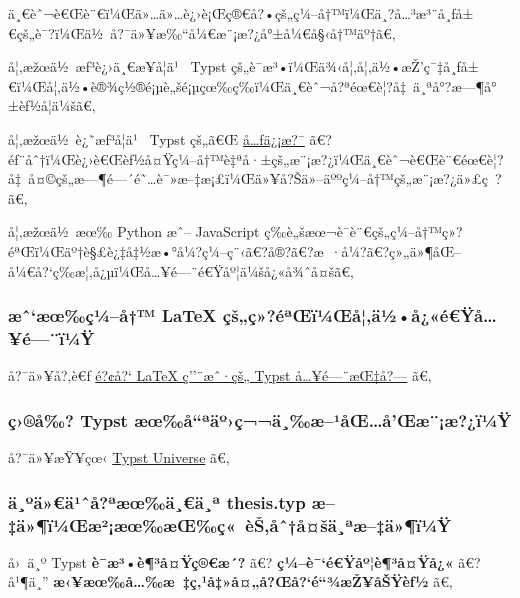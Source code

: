 ä¸€èˆ¬è€Œè¨€ï¼Œä»\ldots ä»\ldots è¿›è¡Œç®€å?•çš„ç¼--å†™ï¼Œä¸?å\ldots³æ³¨å¸ƒå±€çš„è¯?ï¼Œä½~å?¯ä»¥æ‰``å¼€æ¨¡æ?¿å°±å¼€å§‹å†™äº†ã€‚

å¦‚æžœä½~æƒ³è¿›ä¸€æ­¥å­¦ä¹~ Typst
çš„è¯­æ³•ï¼Œä¾‹å¦‚å¦‚ä½•æŽ'ç¯‡å¸ƒå±€ï¼Œå¦‚ä½•è®¾ç½®é¡µè„šé¡µçœ‰ç­‰ï¼Œä¸€èˆ¬å?ªéœ€è¦?å‡~ä¸ªå°?æ---¶å°±èƒ½å­¦ä¼šã€‚

å¦‚æžœä½~è¿˜æƒ³å­¦ä¹~ Typst çš„ã€Œ
\href{https://typst-doc-cn.github.io/docs/reference/meta/}{å\ldots ƒä¿¡æ?¯}
ã€?éƒ¨åˆ†ï¼Œè¿›è€Œèƒ½å¤Ÿç¼--å†™è‡ªå·±çš„æ¨¡æ?¿ï¼Œä¸€èˆ¬è€Œè¨€éœ€è¦?å‡~å¤©çš„æ---¶é---´é˜\ldots è¯»æ--‡æ¡£ï¼Œä»¥å?Šä»--äººç¼--å†™çš„æ¨¡æ?¿ä»£ç~?ã€‚

å¦‚æžœä½~æœ‰ Python æˆ-- JavaScript
ç­‰è„šæœ¬è¯­è¨€çš„ç¼--å†™ç»?éªŒï¼Œäº†è§£è¿‡å‡½æ•°å¼?ç¼--ç¨‹ã€?å®?ã€?æ~·å¼?ã€?ç»„ä»¶åŒ--å¼€å?{}`ç­‰æ¦‚å¿µï¼Œå\ldots¥é---¨é€Ÿåº¦ä¼šå¿«å¾ˆå¤šã€‚

\subsubsection{æˆ`æœ‰ç¼--å†™ LaTeX
çš„ç»?éªŒï¼Œå¦‚ä½•å¿«é€Ÿå\ldots¥é---¨ï¼Ÿ}\label{uxe6ux2c6uxe6ux153uxe7uxbcuxe5-latex-uxe7ux161uxe7uxe9uxaaux153uxefuxbcux153uxe5uxe4uxbduxe5uxe9uxffuxe5uxe9uxefuxbcuxff}

å?¯ä»¥å?‚è€ƒ
\href{https://typst-doc-cn.github.io/docs/guides/guide-for-latex-users/}{é?¢å?{}`
LaTeX ç''¨æˆ·çš„ Typst å\ldots¥é---¨æŒ‡å?---} ã€‚

\subsubsection{ç›®å‰? Typst
æœ‰å``ªäº›ç¬¬ä¸‰æ--¹åŒ\ldots å'Œæ¨¡æ?¿ï¼Ÿ}\label{uxe7uxe5-typst-uxe6ux153uxe5uxaauxe4uxbauxe7uxe4uxe6uxb9uxe5ux153uxe5ux153uxe6uxe6uxefuxbcuxff}

å?¯ä»¥æŸ¥çœ‹ \href{https://typst.app/universe}{Typst Universe} ã€‚

\subsubsection{ä¸ºä»€ä¹ˆå?ªæœ‰ä¸€ä¸ª thesis.typ
æ--‡ä»¶ï¼Œæ²¡æœ‰æŒ‰ç«~èŠ‚åˆ†å¤šä¸ªæ--‡ä»¶ï¼Ÿ}\label{uxe4uxbauxe4uxe4uxb9ux2c6uxe5uxaauxe6ux153uxe4uxe4uxaa-thesis.typ-uxe6uxe4uxefuxbcux153uxe6uxb2uxe6ux153uxe6ux153uxe7-uxe8ux161uxe5ux2c6uxe5ux161uxe4uxaauxe6uxe4uxefuxbcuxff}

å›~ä¸º Typst \textbf{è¯­æ³•è¶³å¤Ÿç®€æ´?} ã€?
\textbf{ç¼--è¯`é€Ÿåº¦è¶³å¤Ÿå¿«} ã€?å¹¶ä¸''
\textbf{æ‹¥æœ‰å\ldots‰æ~‡ç‚¹å‡»å¤„å?Œå?{}`é``¾æŽ¥åŠŸèƒ½} ã€‚

